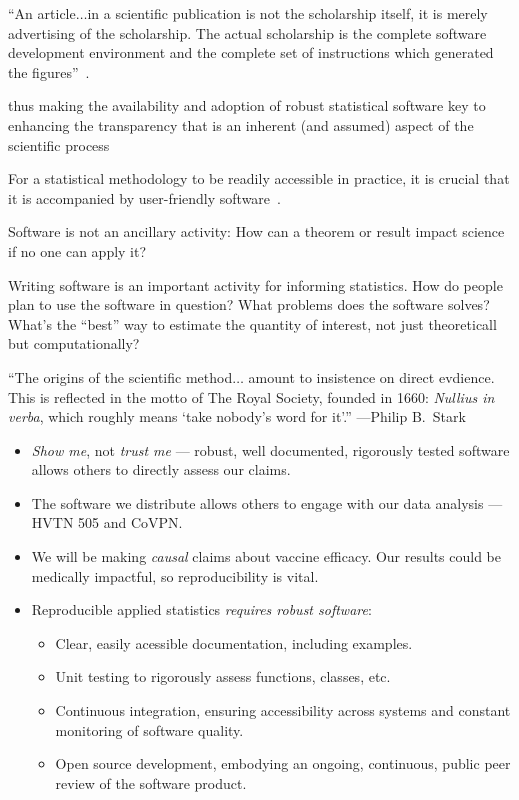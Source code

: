 ``An article$\ldots$in a scientific publication is not the scholarship itself,
it is merely advertising of the scholarship. The actual scholarship is the
complete software development environment and the complete set of instructions
which generated the figures''~\citet{buckheit1995wavelab}.

thus making the availability and adoption of robust statistical software key to
enhancing the transparency that is an inherent (and assumed) aspect of the
scientific process

For a statistical methodology to be readily accessible in practice, it is
crucial that it is accompanied by user-friendly
software~\citep{pullenayegum2016knowledge, stromberg2004write}.

\citet{peng2011reproducible, kitzes2017practice, peng2009reproducible,
stodden2014implementing, millman2018developing, vdl2022targeted}

Software is not an ancillary activity: How can a theorem or
result impact science if no one can apply it?

Writing software is an important activity for informing statistics.
How do people plan to use the software in question?
What problems does the software solves?
What’s the ``best'' way to estimate the quantity of interest, not just
theoreticall but computationally?

``The origins of the scientific method$\ldots$ amount to insistence on direct
evdience. This is reflected in the motto of The Royal Society, founded in 1660:
\textit{Nullius in verba}, which roughly means `take nobody's word for it'.''
---Philip B.~Stark~\citep{kitzes2017practice}

\begin{itemize}
  \itemsep4pt
  \item \textit{Show me}, not \textit{trust me} --- robust, well documented,
    rigorously tested software allows others to directly assess our claims.
  \item The software we distribute allows others to engage with our data
  analysis --- HVTN 505 and CoVPN.
  \item We will be making \textit{causal} claims about vaccine efficacy. Our
    results could be medically impactful, so reproducibility is vital.
\end{itemize}

\begin{itemize}
  \item Reproducible applied statistics \textit{requires robust software}:
    \begin{itemize}
      \itemsep4pt
      \item Clear, easily acessible documentation, including examples.
      \item Unit testing to rigorously assess functions, classes, etc.
      \item Continuous integration, ensuring accessibility across systems and
        constant monitoring of software quality.
      \item Open source development, embodying an ongoing, continuous, public
        peer review of the software product.
    \end{itemize}
\end{itemize}

